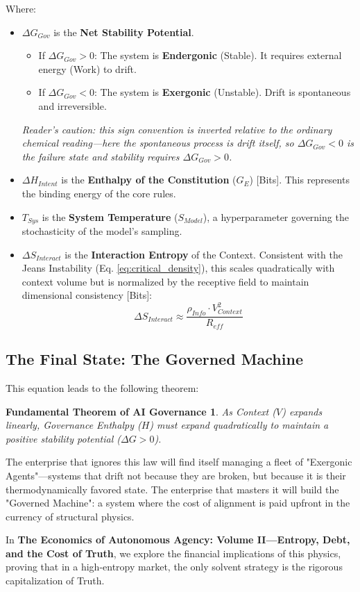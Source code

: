 \documentclass[11pt, a4paper]{article}
\newcommand{\Ge}{G_E}
\newcommand{\Vctx}{V_{Context}}
\newtheorem*{fundamentaltheorem}{Fundamental Theorem of AI Governance}
\begin{document}
\noindent
Where:
\begin{itemize}
    \item \textbf{$\Delta G_{Gov}$} is the \textbf{Net Stability Potential}.
    \begin{itemize}
        \item If $\Delta G_{Gov} > 0$: The system is \textbf{Endergonic} (Stable). It requires external energy (Work) to drift.
        \item If $\Delta G_{Gov} < 0$: The system is \textbf{Exergonic} (Unstable). Drift is spontaneous and irreversible.
    \end{itemize}
    \textit{Reader's caution: this sign convention is inverted relative to the ordinary chemical reading---here the spontaneous process is drift itself, so $\Delta G_{Gov} < 0$ is the failure state and stability requires $\Delta G_{Gov} > 0$.}
    \item \textbf{$\Delta H_{Intent}$} is the \textbf{Enthalpy of the Constitution} ($\Ge$) [Bits]. This represents the binding energy of the core rules.
    \item \textbf{$T_{Sys}$} is the \textbf{System Temperature} ($S_{Model}$), a hyperparameter governing the stochasticity of the model's sampling.
    \item \textbf{$\Delta S_{Interact}$} is the \textbf{Interaction Entropy} of the Context. Consistent with the Jeans Instability (Eq. \ref{eq:critical_density}), this scales quadratically with context volume but is normalized by the receptive field to maintain dimensional consistency [Bits]:
    \[ \Delta S_{Interact} \approx \frac{\rho_{Info} \cdot \Vctx^2}{R_{eff}} \]
\end{itemize}

\subsection{The Final State: The Governed Machine}

This equation leads to the following theorem:

\begin{fundamentaltheorem}
    As Context ($V$) expands linearly, Governance Enthalpy ($H$) must expand quadratically to maintain a positive stability potential ($\Delta G > 0$).
\end{fundamentaltheorem}

The enterprise that ignores this law will find itself managing a fleet of "Exergonic Agents"---systems that drift not because they are broken, but because it is their thermodynamically favored state. The enterprise that masters it will build the "Governed Machine": a system where the cost of alignment is paid upfront in the currency of structural physics.

In \textbf{The Economics of Autonomous Agency: Volume II---Entropy, Debt, and the Cost of Truth}, we explore the financial implications of this physics, proving that in a high-entropy market, the only solvent strategy is the rigorous capitalization of Truth.


\end{document}
